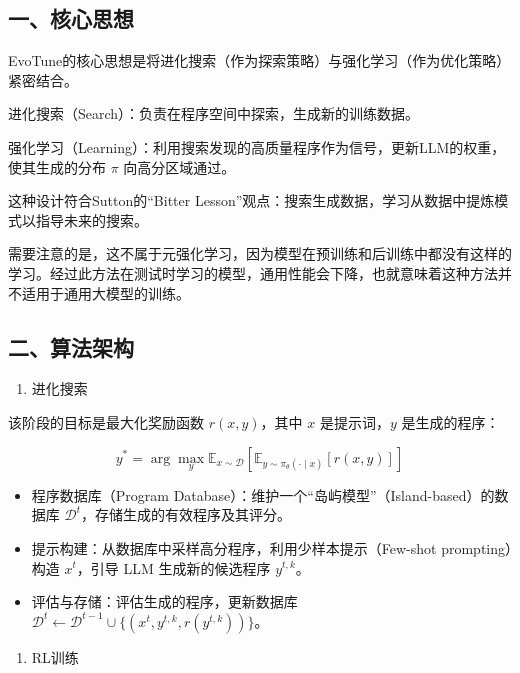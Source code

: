 \hypertarget{ux4e00ux6838ux5fc3ux601dux60f3-12}{%
\subsection{一、核心思想}\label{ux4e00ux6838ux5fc3ux601dux60f3-12}}

EvoTune的核心思想是将进化搜索（作为探索策略）与强化学习（作为优化策略）紧密结合。

进化搜索（Search）：负责在程序空间中探索，生成新的训练数据。

强化学习（Learning）：利用搜索发现的高质量程序作为信号，更新LLM的权重，使其生成的分布 \(\pi\) 向高分区域通过。

这种设计符合Sutton的``Bitter Lesson''观点：搜索生成数据，学习从数据中提炼模式以指导未来的搜索。

需要注意的是，这不属于元强化学习，因为模型在预训练和后训练中都没有这样的学习。经过此方法在测试时学习的模型，通用性能会下降，也就意味着这种方法并不适用于通用大模型的训练。

\hypertarget{ux4e8cux7b97ux6cd5ux67b6ux6784}{%
\subsection{二、算法架构}\label{ux4e8cux7b97ux6cd5ux67b6ux6784}}

\begin{enumerate}
\def\labelenumi{\arabic{enumi}.}
\tightlist
\item
  进化搜索
\end{enumerate}

该阶段的目标是最大化奖励函数 \(r(x,y)\)，其中 \(x\) 是提示词，\(y\) 是生成的程序：

\[
y^* = \arg\max_y \mathbb{E}_{x \sim \mathcal{D}}\left[\mathbb{E}_{y \sim \pi_\theta(\cdot \mid x)}[r(x,y)]\right]
\]

\begin{itemize}
\tightlist
\item
  程序数据库（Program Database）：维护一个``岛屿模型''（Island-based）的数据库 \(\mathcal{D}^t\)，存储生成的有效程序及其评分。
\item
  提示构建：从数据库中采样高分程序，利用少样本提示（Few-shot prompting）构造 \(x^t\)，引导 LLM 生成新的候选程序 \(y^{t,k}\)。
\item
  评估与存储：评估生成的程序，更新数据库 \(\mathcal{D}^t \leftarrow \mathcal{D}^{t-1} \cup \{(x^t, y^{t,k}, r(y^{t,k}))\}\)。
\end{itemize}

\begin{enumerate}
\def\labelenumi{\arabic{enumi}.}
\setcounter{enumi}{1}
\tightlist
\item
  RL训练
\end{enumerate}

